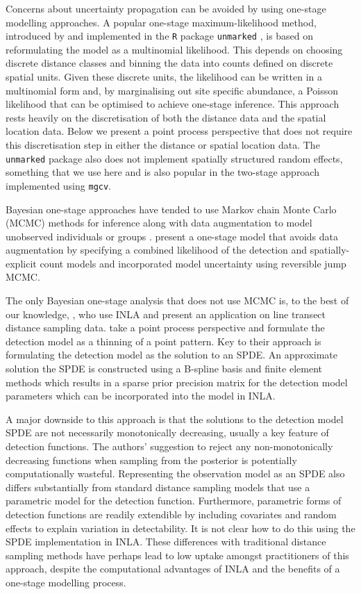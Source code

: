 \documentclass{statsoc}
\begin{document}
Concerns about uncertainty propagation can be avoided by using one-stage modelling approaches.  A popular one-stage maximum-likelihood method, introduced by \cite{royle_ModelingAbundanceEffects_2004} and implemented in the \texttt{R} package \texttt{unmarked} \citep{fiske_UnmarkedPackageFitting_2011}, is based on reformulating the model as a multinomial likelihood.  This depends on choosing discrete distance classes and binning the data into counts defined on discrete spatial units.  Given these discrete units, the likelihood can be written in a multinomial form and, by marginalising out site specific abundance, a Poisson likelihood that can be optimised to achieve one-stage inference.  This approach rests heavily on the discretisation of both the distance data and the spatial location data.  Below we present a point process perspective that does not require this discretisation step in either the distance or spatial location data.  The \texttt{unmarked} package also does not implement spatially structured random effects, something that we use here and is also popular in the two-stage approach implemented using \texttt{mgcv}.  

Bayesian one-stage approaches have tended to use Markov chain Monte Carlo (MCMC) methods for inference along with data augmentation to model unobserved individuals or groups \citep{schmidt_using_2012}.  \citet{oedekoven_bayesian_2014} present a one-stage model that avoids data augmentation by specifying a combined likelihood of the detection and spatially-explicit count models and incorporated model uncertainty using reversible jump MCMC.

The only Bayesian one-stage analysis that does not use MCMC is, to the best of our knowledge, \citet{yuan_point_2017}, who use INLA \citep{rue_approximate_2009} and present an application on line transect distance sampling data.  \citet{yuan_point_2017} take a point process perspective and formulate the detection model as a thinning of a point pattern.  Key to their approach is formulating the detection model as the solution to an SPDE.  An approximate solution the SPDE is constructed using a B-spline basis and finite element methods which results in a sparse prior precision matrix for the detection model parameters which can be incorporated into the model in INLA.  

A major downside to this approach is that the solutions to the detection model SPDE are not necessarily monotonically decreasing, usually a key feature of detection functions.  The authors' suggestion to reject any non-monotonically decreasing functions when sampling from the posterior is potentially computationally wasteful. Representing the observation model as an SPDE also differs substantially from standard distance sampling models that use a parametric model for the detection function.  Furthermore, parametric forms of detection functions are readily extendible by including covariates and random effects to explain variation in detectability.  It is not clear how to do this using the SPDE implementation in INLA.  These differences with traditional distance sampling methods have perhaps lead to low uptake amongst practitioners of this approach, despite the computational advantages of INLA and the benefits of a one-stage modelling process.  
\end{document}
